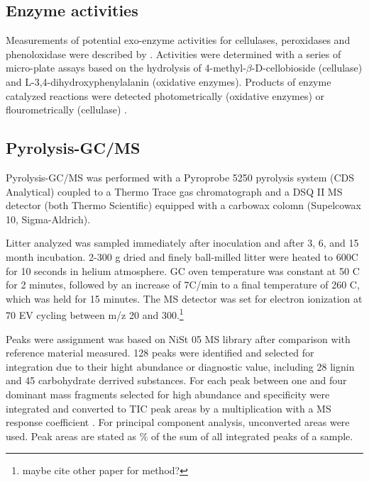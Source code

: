\documentclass[10pt]{article}
\begin{document}


\subsection*{Enzyme activities}

Measurements of potential exo-enzyme activities for cellulases, peroxidases and phenoloxidase were described by \cite{Leitner2011}. Activities were determined with a series of micro-plate assays based on the hydrolysis of 4-methyl-$\beta$-D-cellobioside (cellulase) and L-3,4-di\-hydroxy\-phenyl\-alanin (oxidative enzymes). Products of enzyme catalyzed reactions were detected photometrically (oxidative enzymes) or flourometrically (cellulase) \cite{Marx2001, Sinsabaugh1999, Kaiser2010b}.

\subsection*{Pyrolysis-GC/MS}
Pyrolysis-GC/MS was performed with a Pyroprobe 5250 pyrolysis system (CDS Analytical) coupled to a Thermo Trace gas chromatograph and a DSQ II MS detector (both Thermo Scientific) equipped with a carbowax colomn (Supelcowax 10, Sigma-Aldrich).

Litter analyzed was sampled immediately after inoculation and after 3, 6, and 15 month incubation. 2-300 \textmu g dried and finely ball-milled litter were heated to 600\textdegree C for 10 seconds in helium atmosphere. GC oven temperature was constant at 50 \textdegree C for 2 minutes, followed by an increase of 7\textdegree C/min to a final temperature of 260 \textdegree C, which was held for 15 minutes. The MS detector was set for electron ionization at 70 EV cycling between m/z 20 and 300.\footnote{maybe cite other paper for method?}

Peaks were assignment was based on NiSt 05 MS library after comparison with reference material measured. 128 peaks were identified and selected for integration due to their hight abundance or diagnostic value, including 28 lignin and 45 carbohydrate derrived substances. For each peak between one and four dominant mass fragments selected for high abundance and specificity were integrated and converted to TIC peak areas by a multiplication with a MS response coefficient \cite{Schellekens2009, Kuder1998}. For principal component analysis, unconverted areas were used. Peak areas are stated as \% of the sum of all integrated peaks of a sample.
\end{document}
